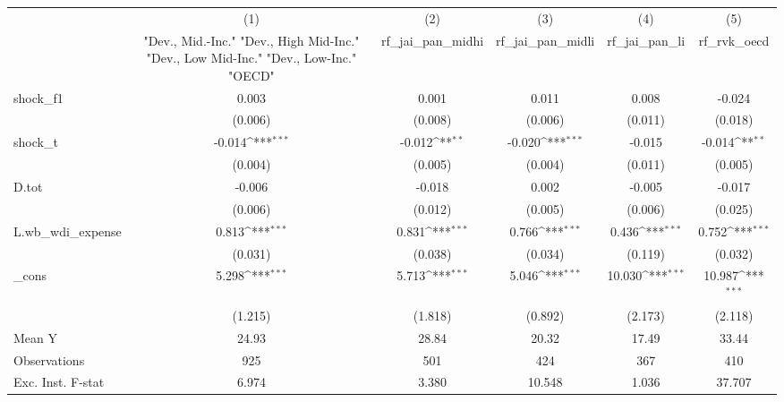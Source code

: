 {
\def\sym#1{\ifmmode^{#1}\else\(^{#1}\)\fi}
\begin{tabular}{l*{5}{c}}
\toprule
            &\multicolumn{1}{c}{(1)}&\multicolumn{1}{c}{(2)}&\multicolumn{1}{c}{(3)}&\multicolumn{1}{c}{(4)}&\multicolumn{1}{c}{(5)}\\
            &\multicolumn{1}{c}{ "Dev., Mid.-Inc." "Dev., High Mid-Inc." "Dev., Low Mid-Inc." "Dev., Low-Inc." "OECD" }&\multicolumn{1}{c}{rf\_jai\_pan\_midhi}&\multicolumn{1}{c}{rf\_jai\_pan\_midli}&\multicolumn{1}{c}{rf\_jai\_pan\_li}&\multicolumn{1}{c}{rf\_rvk\_oecd}\\
\midrule
shock\_f1    &       0.003         &       0.001         &       0.011         &       0.008         &      -0.024         \\
            &     (0.006)         &     (0.008)         &     (0.006)         &     (0.011)         &     (0.018)         \\
\addlinespace
shock\_t     &      -0.014\sym{***}&      -0.012\sym{**} &      -0.020\sym{***}&      -0.015         &      -0.014\sym{**} \\
            &     (0.004)         &     (0.005)         &     (0.004)         &     (0.011)         &     (0.005)         \\
\addlinespace
D.tot       &      -0.006         &      -0.018         &       0.002         &      -0.005         &      -0.017         \\
            &     (0.006)         &     (0.012)         &     (0.005)         &     (0.006)         &     (0.025)         \\
\addlinespace
L.wb\_wdi\_expense&       0.813\sym{***}&       0.831\sym{***}&       0.766\sym{***}&       0.436\sym{***}&       0.752\sym{***}\\
            &     (0.031)         &     (0.038)         &     (0.034)         &     (0.119)         &     (0.032)         \\
\addlinespace
\_cons      &       5.298\sym{***}&       5.713\sym{***}&       5.046\sym{***}&      10.030\sym{***}&      10.987\sym{***}\\
            &     (1.215)         &     (1.818)         &     (0.892)         &     (2.173)         &     (2.118)         \\
\midrule
Mean Y      &       24.93         &       28.84         &       20.32         &       17.49         &       33.44         \\
Observations&         925         &         501         &         424         &         367         &         410         \\
Exc. Inst. F-stat&       6.974         &       3.380         &      10.548         &       1.036         &      37.707         \\
\bottomrule
\end{tabular}
}
